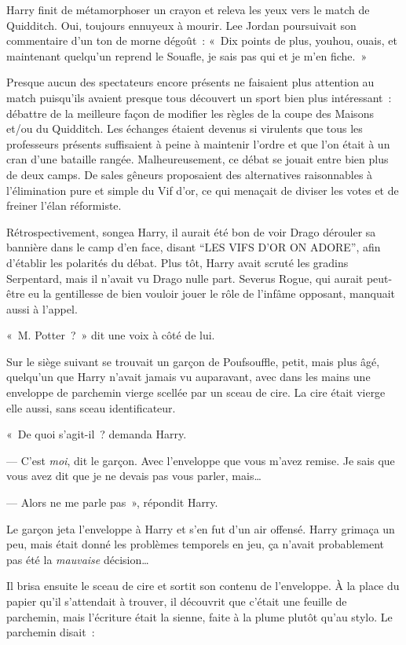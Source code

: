 Harry finit de métamorphoser un crayon et releva les yeux vers le match de Quidditch.
Oui, toujours ennuyeux à mourir.
Lee Jordan poursuivait son commentaire d'un ton de morne dégoût~: «~Dix points de plus, youhou, ouais, et maintenant quelqu'un reprend le Souafle, je sais pas qui et je m'en fiche.~»

Presque aucun des spectateurs encore présents ne faisaient plus attention au match puisqu'ils avaient presque tous découvert un sport bien plus intéressant~: débattre de la meilleure façon de modifier les règles de la coupe des Maisons et/ou du Quidditch.
Les échanges étaient devenus si virulents que tous les professeurs présents suffisaient à peine à maintenir l'ordre et que l'on était à un cran d'une bataille rangée.
Malheureusement, ce débat se jouait entre bien plus de deux camps.
De sales gêneurs proposaient des alternatives raisonnables à l'élimination pure et simple du Vif d'or, ce qui menaçait de diviser les votes et de freiner l'élan réformiste.

Rétrospectivement, songea Harry, il aurait été bon de voir Drago dérouler sa bannière dans le camp d'en face, disant “LES VIFS D'OR ON ADORE”, afin d'établir les polarités du débat.
Plus tôt, Harry avait scruté les gradins Serpentard, mais il n'avait vu Drago nulle part.
Severus Rogue, qui aurait peut-être eu la gentillesse de bien vouloir jouer le rôle de l'infâme opposant, manquait aussi à l'appel.

«~M. Potter~?~»
dit une voix à côté de lui.

Sur le siège suivant se trouvait un garçon de Poufsouffle, petit, mais plus âgé, quelqu'un que Harry n'avait jamais vu auparavant, avec dans les mains une enveloppe de parchemin vierge scellée par un sceau de cire.
La cire était vierge elle aussi, sans sceau identificateur.

«~De quoi s'agit-il~? demanda Harry.

--- C'est \emph{moi}, dit le garçon.
Avec l'enveloppe que vous m'avez remise.
Je sais que vous avez dit que je ne devais pas vous parler, mais…

--- Alors ne me parle pas~», répondit Harry.

Le garçon jeta l'enveloppe à Harry et s'en fut d'un air offensé.
Harry grimaça un peu, mais était donné les problèmes temporels en jeu, ça n'avait probablement pas été la \emph{mauvaise} décision…

Il brisa ensuite le sceau de cire et sortit son contenu de l'enveloppe.
À la place du papier qu'il s'attendait à trouver, il découvrit que c'était une feuille de parchemin, mais l'écriture était la sienne, faite à la plume plutôt qu'au stylo.
Le parchemin disait~:

